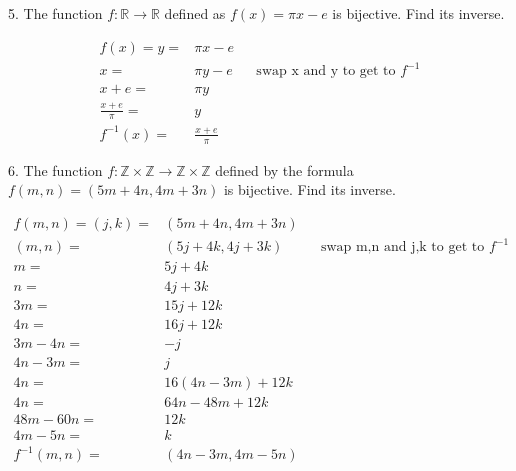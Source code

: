 \documentclass{hippoidC}
\begin{document}
\begin{prooflist}{5. The function $f: \mathbb{R} \rightarrow \mathbb{R}$ defined
		as $f(x)=\pi x-e$ is bijective. Find its inverse.}
	\item
	\begin{align*}
		f(x)=y=          & \pi x-e                                                   \\
		x=               & \pi y-e         &  & \text{swap x and y to get to }f^{-1} \\
		x+e=             & \pi y                                                     \\
		\frac{x+e}{\pi}= & y                                                         \\
		f^{-1}(x) =      & \frac{x+e}{\pi}
	\end{align*}
\end{prooflist}

\begin{prooflist}{6. The function $f: \mathbb{Z} \times \mathbb{Z} \rightarrow
			\mathbb{Z} \times \mathbb{Z}$ defined by the formula $f(m, n)=(5 m+4 n, 4
			m+3 n)$ is bijective. Find its inverse.}
	\item
	\begin{align*}
		f(m, n)=(j, k)= & (5 m+4 n, 4 m+3 n)                                               \\
		(m, n)=         & (5 j+4 k, 4 j+3 k) &  & \text{swap m,n and j,k to get to }f^{-1} \\
		m=              & 5 j+4 k                                                          \\
		n=              & 4 j+3 k                                                          \\
		3m=             & 15 j+12 k                                                        \\
		4n=             & 16 j+12 k                                                        \\
		3m-4n=          & -j                                                               \\
		4n-3m=          & j                                                                \\
		4n=             & 16 (4n-3m)+12 k                                                  \\
		4n=             & 64n-48m+12 k                                                     \\
		48m-60n=        & 12 k                                                             \\
		4m-5n=          & k                                                                \\
		f^{-1}(m, n) =  & (4n-3m, 4m-5n)
	\end{align*}
\end{prooflist}
\end{document}
